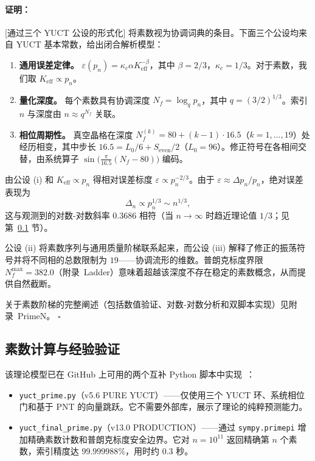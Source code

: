 \documentclass[12pt,a4paper]{article}
\theoremstyle{remark}
\renewenvironment{proof}{\paragraph{证明：}}{\hfill$\square$}
\begin{document}
	\begin{proof}[通过三个 YUCT 公设的形式化]
		将素数视为协调词典的条目。下面三个公设均来自 YUCT 基本常数，给出闭合解析模型：
		\begin{enumerate}[label=(\roman*)]
			\item \textbf{通用误差定律。} \(\varepsilon(p_n) = \kappa_c \alpha K_{\mathrm{eff}}^{-\beta}\)，其中 \(\beta = 2/3\)，\(\kappa_c = 1/3\)。对于素数，我们取 \(K_{\mathrm{eff}} \propto p_n\)。
			\item \textbf{量化深度。} 每个素数具有协调深度 \(N_f = \log_q p_n\)，其中 \(q = (3/2)^{1/3}\)。索引 \(n\) 与深度由 \(n \approx q^{N_f}\) 关联。
			\item \textbf{相位周期性。} 真空晶格在深度 \(N_f^{(k)} = 80 + (k-1)\cdot 16.5\)（\(k=1,\dots,19\)）处经历相变，其中步长 \(16.5 = L_0/6 + S_{\mathrm{even}}/2\)（\(L_0=96\)）。修正符号在各相间交替，由系统算子 \(\sin\bigl(\frac{\pi}{16.5}(N_f-80)\bigr)\) 编码。
		\end{enumerate}
		
		由公设 (i) 和 \(K_{\mathrm{eff}} \propto p_n\) 得相对误差标度 \(\varepsilon \propto p_n^{-2/3}\)。由于 \(\varepsilon \approx \Delta p_n / p_n\)，绝对误差表现为
		\[
		\Delta_n \propto p_n^{1/3} \sim n^{1/3},
		\]
		这与观测到的对数-对数斜率 \(0.3686\) 相符（当 \(n\to\infty\) 时趋近理论值 \(1/3\)；见第~\ref{sec:prime-empirical} 节）。
		
		公设 (ii) 将素数序列与通用质量阶梯联系起来，而公设 (iii) 解释了修正的振荡符号并将不同相的总数限制为 \(19\)——协调流形的维数。普朗克标度界限 \(N_f^{\max} = 382.0\)（附录~Ladder）意味着超越该深度不存在稳定的素数概念，从而提供自然截断。
		
		关于素数阶梯的完整阐述（包括数值验证、对数-对数分析和双脚本实现）见附录~PrimeN。
	\end{proof}
	
	\subsection{素数计算与经验验证}
	\label{sec:prime-empirical}
	
	该理论模型已在 GitHub 上可用的两个互补 Python 脚本中实现~\cite{PrimeRepo}：
	\begin{itemize}
		\item \texttt{yuct\_prime.py}（v5.6 PURE YUCT）——仅使用三个 YUCT 环、系统相位门和基于 PNT 的向量跳跃。它不需要外部库，展示了理论的纯粹预测能力。
		\item \texttt{yuct\_final\_prime.py}（v13.0 PRODUCTION）——通过 \texttt{sympy.primepi} 增加精确素数计数和普朗克标度安全边界。它对 \(n=10^{11}\) 返回精确第 \(n\) 个素数，索引精度达 \(99.999988\%\)，用时约 \(0.3\) 秒。
	\end{itemize}
	
\end{document}
